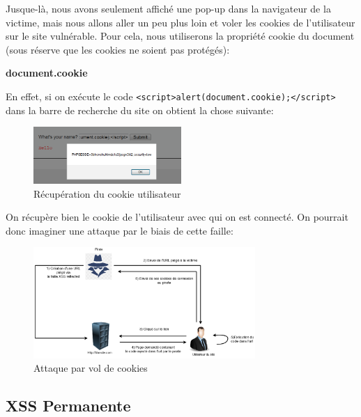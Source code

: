 Jusque-là, nous avons seulement affiché une pop-up dans la navigateur de la victime, mais nous allons aller un peu plus loin et voler les cookies de l’utilisateur sur le site vulnérable. Pour cela, nous utiliserons la propriété cookie du document (sous réserve que les cookies ne soient pas protégés):

\begin{center}
    \textbf{document.cookie}
\end{center}

 En effet, si on exécute le code \lstinline{<script>alert(document.cookie);</script>} dans la barre de recherche du site on obtient la chose suivante:

\begin{figure}[htp!]
  \centering
  \setlength\figureheight{7cm}
  \setlength\figurewidth{9cm}
  \includegraphics[width=0.5\textwidth]{oui/images/xss/xss5.PNG}
  \caption{Récupération du cookie utilisateur}
  \label{fig:courbe-tikz}
\end{figure}

On récupère bien le cookie de l'utilisateur avec qui on est connecté. On pourrait donc imaginer une attaque par le biais de cette faille: 


\begin{figure}[htp!]
  \centering
  \setlength\figureheight{7cm}
  \setlength\figurewidth{9cm}
  \includegraphics[width=0.75\textwidth]{oui/images/xss/Untitled Diagram(3).png}
  \caption{Attaque par vol de cookies}
  \label{fig:courbe-tikz}
\end{figure}

\newpage

\subsection{XSS Permanente}

